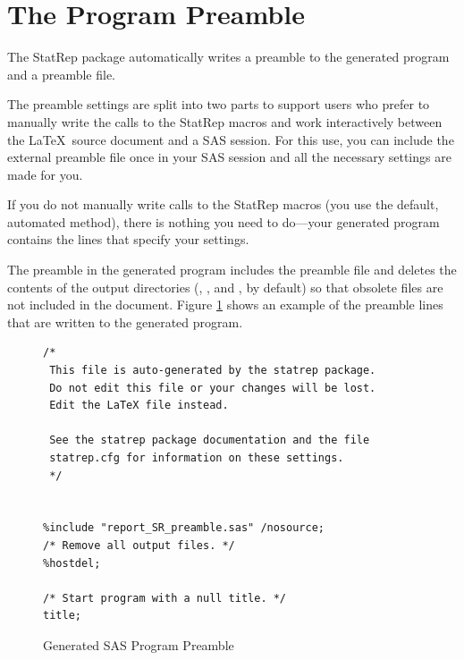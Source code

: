 \documentclass[article,oneside]{memoir}
\newcommand*{\StatRep}{\textsf{StatRep}\xspace}
\begin{document}
  \section{The Program Preamble}

The \StatRep package automatically writes a preamble to the generated program and a preamble file.

The preamble settings are split into two parts to support users who prefer to
manually write the calls to the \StatRep macros and work interactively between the
\LaTeX\ source document and a SAS session.  For this use, you can include the external
preamble file once in your SAS session and all the necessary settings are made for you.

If you do not manually write calls to the \StatRep macros (you use the default, automated method),
there is nothing you need to do---your generated program contains the lines that specify your settings.

The preamble in the generated program includes the preamble file and deletes the contents of the
output directories (, , and , by default) so that obsolete files are
not included in the document.
Figure \ref{fig:pgmpreamble} shows an example of the preamble lines
that are written to the generated program.
\begin{figure}[H]
\begin{snugshade}
\begin{verbatim}
/*
 This file is auto-generated by the statrep package.
 Do not edit this file or your changes will be lost.
 Edit the LaTeX file instead.

 See the statrep package documentation and the file
 statrep.cfg for information on these settings.
 */


%include "report_SR_preamble.sas" /nosource;
/* Remove all output files. */
%hostdel;

/* Start program with a null title. */
title;
\end{verbatim}
\end{snugshade}
\caption{Generated SAS Program Preamble}\label{fig:pgmpreamble}
\end{figure}
\end{document}
